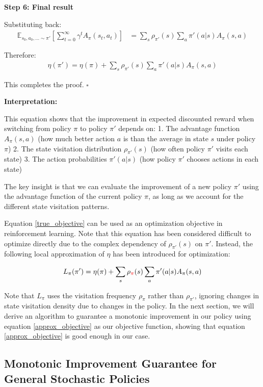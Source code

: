\textbf{Step 6: Final result}

Substituting back:
\begin{align}
\mathbb{E}_{s_{0}, a_{0}, \ldots \sim \pi'} \left[ \sum_{t = 0}^{\infty} \gamma^t A_\pi(s_t, a_t) \right] &= \sum_{s} \rho_{\pi'}(s) \sum_{a} \pi'(a | s) A_\pi(s, a)
\end{align}

Therefore:
\begin{align}
\eta(\pi') = \eta(\pi) + \sum_{s}\rho_{\pi'}(s)\sum_{a}\pi'(a|s)A_{\pi}(s, a)
\end{align}

This completes the proof. $\square$

\textbf{Interpretation:}

This equation shows that the improvement in expected discounted reward when switching from policy $\pi$ to policy $\pi'$ depends on:
1. The advantage function $A_\pi(s,a)$ (how much better action $a$ is than the average in state $s$ under policy $\pi$)
2. The state visitation distribution $\rho_{\pi'}(s)$ (how often policy $\pi'$ visits each state)
3. The action probabilities $\pi'(a|s)$ (how policy $\pi'$ chooses actions in each state)

The key insight is that we can evaluate the improvement of a new policy $\pi'$ using the advantage function of the current policy $\pi$, as long as we account for the different state visitation patterns.

Equation \ref{true_objective} can be used as an optimization objective in reinforcement learning. Note that this equation has been considered difficult to optimize directly due to the complex dependency of $\rho_{\pi'}(s)$ on $\pi'$. Instead, the following local approximation of $\eta$ has been introduced for optimization:

\begin{align}\label{approx_objective}
    L_{\pi}(\pi') = \eta(\pi) + \sum_{s}\rho_{\textcolor{red}{\pi}}(s)\sum_{a}\pi'(a|s)A_{\pi}(s, a)
\end{align}

Note that $L_{\pi}$ uses the visitation frequency $\rho_{\pi}$ rather than $\rho_{\pi'}$, ignoring changes in state visitation density due to changes in the policy. In the next section, we will derive an algorithm to guarantee a monotonic improvement in our policy using equation \ref{approx_objective} as our objective function, showing that equation \ref{approx_objective} is good enough in our case.

\subsection{Monotonic Improvement Guarantee for General Stochastic Policies}

